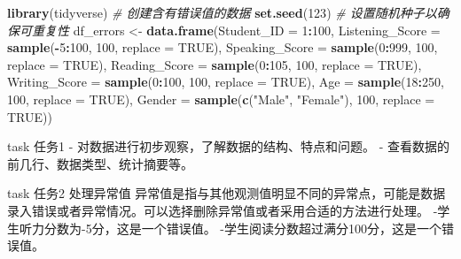 \documentclass[]{book}
\newenvironment{Shaded}{\begin{snugshade}}{\end{snugshade}}
\newcommand{\CommentTok}[1]{\textcolor[rgb]{0.56,0.35,0.01}{\textit{#1}}}
\newcommand{\DataTypeTok}[1]{\textcolor[rgb]{0.13,0.29,0.53}{#1}}
\newcommand{\DecValTok}[1]{\textcolor[rgb]{0.00,0.00,0.81}{#1}}
\newcommand{\KeywordTok}[1]{\textcolor[rgb]{0.13,0.29,0.53}{\textbf{#1}}}
\newcommand{\NormalTok}[1]{#1}
\newcommand{\OperatorTok}[1]{\textcolor[rgb]{0.81,0.36,0.00}{\textbf{#1}}}
\newcommand{\OtherTok}[1]{\textcolor[rgb]{0.56,0.35,0.01}{#1}}
\newcommand{\StringTok}[1]{\textcolor[rgb]{0.31,0.60,0.02}{#1}}
\begin{document}
\begin{Shaded}
\begin{Highlighting}[]
\KeywordTok{library}\NormalTok{(tidyverse)}
\CommentTok{# 创建含有错误值的数据}
\KeywordTok{set.seed}\NormalTok{(}\DecValTok{123}\NormalTok{)  }\CommentTok{# 设置随机种子以确保可重复性}
\NormalTok{df_errors <-}\StringTok{ }\KeywordTok{data.frame}\NormalTok{(}\DataTypeTok{Student_ID =} \DecValTok{1}\OperatorTok{:}\DecValTok{100}\NormalTok{,}
                    \DataTypeTok{Listening_Score =} \KeywordTok{sample}\NormalTok{(}\OperatorTok{-}\DecValTok{5}\OperatorTok{:}\DecValTok{100}\NormalTok{, }\DecValTok{100}\NormalTok{, }\DataTypeTok{replace =} \OtherTok{TRUE}\NormalTok{),}
                    \DataTypeTok{Speaking_Score =} \KeywordTok{sample}\NormalTok{(}\DecValTok{0}\OperatorTok{:}\DecValTok{999}\NormalTok{, }\DecValTok{100}\NormalTok{, }\DataTypeTok{replace =} \OtherTok{TRUE}\NormalTok{),}
                    \DataTypeTok{Reading_Score =} \KeywordTok{sample}\NormalTok{(}\DecValTok{0}\OperatorTok{:}\DecValTok{105}\NormalTok{, }\DecValTok{100}\NormalTok{, }\DataTypeTok{replace =} \OtherTok{TRUE}\NormalTok{),}
                    \DataTypeTok{Writing_Score =} \KeywordTok{sample}\NormalTok{(}\DecValTok{0}\OperatorTok{:}\DecValTok{100}\NormalTok{, }\DecValTok{100}\NormalTok{, }\DataTypeTok{replace =} \OtherTok{TRUE}\NormalTok{),}
                    \DataTypeTok{Age =} \KeywordTok{sample}\NormalTok{(}\DecValTok{18}\OperatorTok{:}\DecValTok{250}\NormalTok{, }\DecValTok{100}\NormalTok{, }\DataTypeTok{replace =} \OtherTok{TRUE}\NormalTok{),}
                    \DataTypeTok{Gender =} \KeywordTok{sample}\NormalTok{(}\KeywordTok{c}\NormalTok{(}\StringTok{"Male"}\NormalTok{, }\StringTok{"Female"}\NormalTok{), }\DecValTok{100}\NormalTok{, }\DataTypeTok{replace =} \OtherTok{TRUE}\NormalTok{))}
\end{Highlighting}
\end{Shaded}

\begin{infobox}task
任务1
- 对数据进行初步观察，了解数据的结构、特点和问题。
- 查看数据的前几行、数据类型、统计摘要等。

\end{infobox}

\begin{infobox}task
任务2 处理异常值
异常值是指与其他观测值明显不同的异常点，可能是数据录入错误或者异常情况。可以选择删除异常值或者采用合适的方法进行处理。
-学生听力分数为-5分，这是一个错误值。
-学生阅读分数超过满分100分，这是一个错误值。

\end{infobox}
\end{document}
